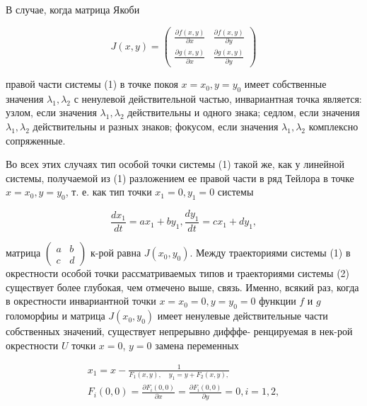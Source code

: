 \documentclass[10pt]{article}
\begin{document}
В случае, когда матрица Якоби



\[

J(x, y)=\left(\begin{array}{ll}

\frac{\partial f(x, y)}{\partial x} & \frac{\partial f(x, y)}{\partial y} \\

\frac{\partial g(x, y)}{\partial x} & \frac{\partial g(x, y)}{\partial y}

\end{array}\right)

\]



правой части системы (1) в точке покоя $x=x_{0}, y=y_{0}$ имеет собственные значения $\lambda_{1}, \lambda_{2}$ с ненулевой действительной частью, инвариантная точка является: узлом, если значения $\lambda_{1}, \lambda_{2}$ действительны и одного знака; седлом, если значения $\lambda_{1}, \lambda_{2}$ действительны и разных знаков; фокусом, если значения $\lambda_{1}, \lambda_{2}$ комплексно сопряженные.



Во всех этих случаях тип особой точки системы (1) такой же, как у линейной системы, получаемой из (1) разложением ее правой части в ряд Тейлора в точке $x=x_{0}, y=y_{0}$, т. е. как тип точки $x_{1}=0, y_{1}=0$ системы



\[

\frac{d x_{1}}{d t}=a x_{1}+b y_{1}, \frac{d y_{1}}{d t}=c x_{1}+d y_{1},

\]



матрица $\left(\begin{array}{ll}a & b \\ c & d\end{array}\right)$ к-рой равна $J\left(x_{0}, y_{0}\right)$. Между траекториями системы (1) в окрестности особой точки рассматриваемых типов и траекториями системы (2) существует более глубокая, чем отмечено выше, связь. Именно, всякий раз, когда в окрестности инвариантной точки $x=x_{0}=0, y=y_{0}=0$ функции $f$ и $g$ голоморфиы и матрица $J\left(x_{0}, y_{0}\right)$ имеет ненулевые действительные части собственных значений, существует непрерывно дифффе- ренцируемая в нек-рой окрестности $U$ точки $x=0$, $y=0$ замена переменных



\[

\begin{gathered}

x_{1}=x-\frac{1}{F_{1}(x, y), \quad y_{1}=y+F_{2}(x, y),} \\

F_{i}(0,0)=\frac{\partial F_{i}(0,0)}{\partial x}=\frac{\partial F_{i}(0,0)}{\partial y}=0, i=1,2,

\end{gathered}

\]
\end{document}
